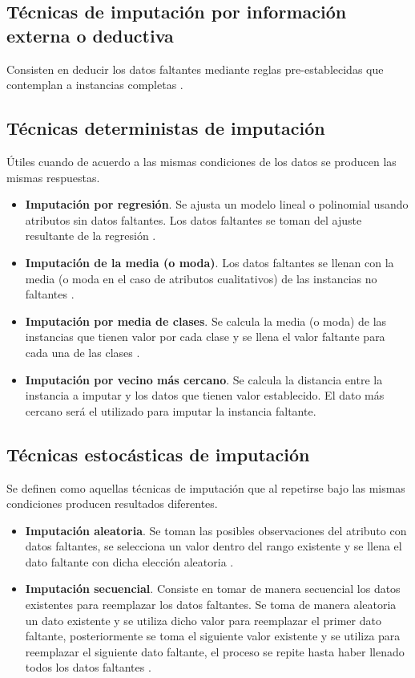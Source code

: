 \subsection{Técnicas de imputación por información externa o deductiva}
Consisten en deducir los datos faltantes mediante reglas pre-establecidas que contemplan a instancias completas \cite{Aceves2021}.

\subsection{Técnicas deterministas de imputación}
Útiles cuando de acuerdo a las mismas condiciones de los datos se producen las mismas respuestas.

\begin{itemize}
	\item \textbf{Imputación por regresión}. Se ajusta un modelo lineal o polinomial usando atributos sin datos faltantes. Los datos faltantes se toman del ajuste resultante de la regresión \cite{Aceves2021}.
	\item \textbf{Imputación de la media (o moda)}. Los datos faltantes se llenan con la media (o moda en el caso de atributos cualitativos) de las instancias no faltantes \cite{Aceves2021}.
	\item \textbf{Imputación por media de clases}. Se calcula la media (o moda) de las instancias que tienen valor por cada clase y se llena el valor faltante para cada una de las clases \cite{Aceves2021}.
	\item \textbf{Imputación por vecino más cercano}. Se calcula la distancia entre la instancia a imputar y los datos que tienen valor establecido. El dato más cercano será el utilizado para imputar la instancia faltante.
\end{itemize}

\subsection{Técnicas estocásticas de imputación}
Se definen como aquellas técnicas de imputación que al repetirse bajo las mismas condiciones producen resultados diferentes.

\begin{itemize}
	\item \textbf{Imputación aleatoria}. Se toman las posibles observaciones del atributo con datos faltantes, se selecciona un valor dentro del rango existente y se llena el dato faltante con dicha elección aleatoria \cite{Aceves2021}.
	\item \textbf{Imputación secuencial}. Consiste en tomar de manera secuencial los datos existentes para reemplazar los datos faltantes. Se toma de manera aleatoria un dato existente y se utiliza dicho valor para reemplazar el primer dato faltante, posteriormente se toma el siguiente valor existente y se utiliza para reemplazar el siguiente dato faltante, el proceso se repite hasta haber llenado todos los datos faltantes \cite{Aceves2021}.
\end{itemize}

